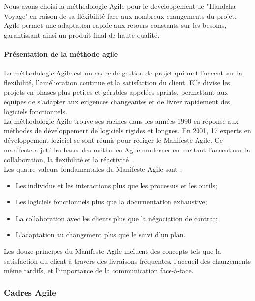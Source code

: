 \documentclass[12pt]{report}
\begin{document}
				Nous avons choisi la méthodologie Agile pour le developpement de "Handeha Voyage" en raison de sa fléxibilité face aux nombreux changements du projet.\\
				
				Agile permet une adaptation rapide aux retours constants sur les besoins, garantissant ainsi un produit final de haute qualité.\\				

				\paragraph{Présentation de la méthode agile}

				La méthodologie Agile est un cadre de gestion de projet qui met l'accent sur la flexibilité, l'amélioration continue et la satisfaction du client. Elle divise les projets en phases plus petites et gérables appelées sprints, permettant aux équipes de s'adapter aux exigences changeantes et de livrer rapidement des logiciels fonctionnels.\\
	
				La méthodologie Agile trouve ses racines dans les années 1990 en réponse aux méthodes de développement de logiciels rigides et longues. En 2001, 17 experts en développement logiciel se sont réunis pour rédiger le Manifeste Agile. Ce manifeste a jeté les bases des méthodes Agile modernes en mettant l'accent sur la collaboration, la flexibilité et la réactivité \cite{Asana}.\\

				Les quatre valeurs fondamentales du Manifeste Agile sont :

				\begin{itemize}
					\item Les individus et les interactions plus que les processus et les outils;
					\item Les logiciels fonctionnels plus que la documentation exhaustive;
					\item La collaboration avec les clients plus que la négociation de contrat;
					\item L'adaptation au changement plus que le suivi d'un plan.
				\end{itemize}

				Les douze principes du Manifeste Agile incluent des concepts tels que la satisfaction du client à travers des livraisons fréquentes, l'accueil des changements même tardifs, et l'importance de la communication face-à-face.

				\subsubsection{Cadres Agile}
\end{document}
